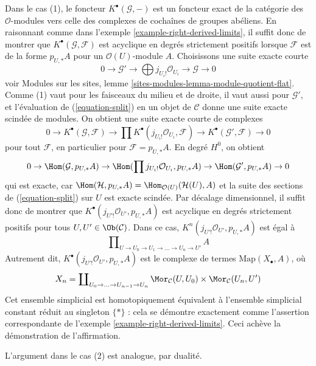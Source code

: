 \begin{example}
Dans le cas (1), le foncteur $K^\bullet(\mathcal{G}, -)$ est un foncteur exact
de la catégorie des $\mathcal{O}$-modules vers celle des complexes de
cochaînes de groupes abéliens. En raisonnant comme dans l'exemple
\ref{example-right-derived-limits}, il suffit donc de montrer que
$K^\bullet(\mathcal{G}, \mathcal{F})$ est acyclique en degrés strictement
positifs lorsque $\mathcal{F}$ est de la forme $p_{U, *}A$ pour un
$\mathcal{O}(U)$-module $A$.
Choisissons une suite exacte courte
\begin{equation}
\label{equation-split}
0 \to \mathcal{G}' \to \bigoplus j_{U_i!}\mathcal{O}_{U_i} \to
\mathcal{G} \to 0
\end{equation}
voir Modules sur les sites, lemme
\ref{sites-modules-lemma-module-quotient-flat}. Comme (1) vaut pour les
faisceaux du milieu et de droite, il vaut aussi pour $\mathcal{G}'$, et
l'évaluation de (\ref{equation-split}) en un objet de $\mathcal{C}$ donne une
suite exacte scindée de modules. On obtient une suite exacte courte de
complexes
$$
0 \to
K^\bullet(\mathcal{G}, \mathcal{F}) \to
\prod K^\bullet(j_{U_i!}\mathcal{O}_{U_i}, \mathcal{F}) \to
K^\bullet(\mathcal{G}', \mathcal{F}) \to 0
$$
pour tout $\mathcal{F}$, en particulier pour
$\mathcal{F} = p_{U, *}A$. En degré $H^0$, on obtient
$$
0 \to \Hom(\mathcal{G}, p_{U, *}A) \to
\Hom(\prod j_{U_i!}\mathcal{O}_{U_i}, p_{U, *}A) \to
\Hom(\mathcal{G}', p_{U, *}A) \to 0
$$
qui est exacte, car
$\Hom(\mathcal{H}, p_{U, *}A) = \Hom_{\mathcal{O}(U)}(\mathcal{H}(U), A)$
et la suite des sections de (\ref{equation-split}) sur $U$ est exacte
scindée. Par décalage dimensionnel, il suffit donc de montrer que
$K^\bullet(j_{U'!}\mathcal{O}_{U'}, p_{U, *}A)$ est acyclique en degrés
strictement positifs pour tous $U, U' \in \Ob(\mathcal{C})$. Dans ce cas,
$K^n(j_{U'!}\mathcal{O}_{U'}, p_{U, *}A)$ est égal à
$$
\prod\nolimits_{U \to U_0 \to U_1 \to \ldots \to U_n \to U'} A
$$
Autrement dit, $K^\bullet(j_{U'!}\mathcal{O}_{U'}, p_{U, *}A)$ est le
complexe de termes $\text{Map}(X_\bullet, A)$, où
$$
X_n = \coprod\nolimits_{U_0 \to \ldots \to U_{n - 1} \to U_n}
\Mor_\mathcal{C}(U, U_0) \times \Mor_\mathcal{C}(U_n, U')
$$
Cet ensemble simplicial est homotopiquement équivalent à l'ensemble
simplicial constant réduit au singleton $\{*\}$ : cela se démontre exactement
comme l'assertion correspondante de l'exemple
\ref{example-right-derived-limits}. Ceci achève la démonstration de
l'affirmation.

\medskip\noindent
L'argument dans le cas (2) est analogue, par dualité.
\end{example}






